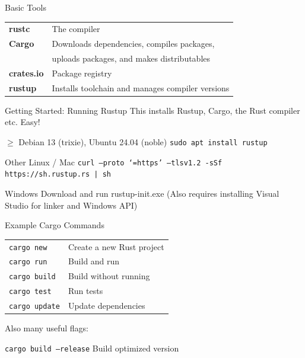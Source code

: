 \documentclass{beamer}
\begin{document}
\begin{frame}{Basic Tools} 
\begin{block}{}
\pause 
\begin{tabular}{@{}l l@{}}
\textbf{rustc}        & The compiler \\ \pause
\textbf{Cargo}        & Downloads dependencies, compiles packages, \\ 
                      & uploads packages, and makes distributables\\ \pause
\textbf{crates.io}    & Package registry \\ \pause
\textbf{rustup}       & Installs toolchain and manages compiler versions \\
\end{tabular}
\end{block}
\end{frame}


\begin{frame}{Getting Started: Running Rustup} 
This installs Rustup, Cargo, the Rust compiler etc. Easy! 
\pause 
\begin{block}{$\geq$ Debian 13 (trixie), Ubuntu 24.04 (noble)}
\texttt{sudo apt install rustup}
\end{block}
\pause 
\begin{block}{Other Linux / Mac}
\texttt{curl --proto `=https' --tlsv1.2 -sSf https://sh.rustup.rs | sh}
\end{block}
\pause 
\begin{block}{Windows}
Download and run rustup-init.exe (Also requires installing Visual Studio for linker and Windows API)
\end{block}
\end{frame}

\begin{frame}{Example Cargo Commands} 
\begin{block}{}
\pause
\begin{tabular}{@{}l l@{}}
\texttt{cargo new}     & Create a new Rust project \\ \pause
\texttt{cargo run}     & Build and run \\ \pause
\texttt{cargo build}     & Build without running \\ \pause
\texttt{cargo test}    & Run tests \\ \pause
\texttt{cargo update}  & Update dependencies\\
\end{tabular}
\end{block}
 \pause
Also many useful flags:
\begin{block}{}
\texttt{cargo build --release} \hspace{3em} Build optimized version
\end{block}
\end{frame}
\end{document}
